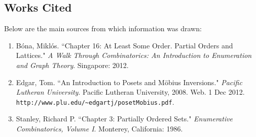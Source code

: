 \documentclass{article} %
\theoremstyle{definition}
\theoremstyle{plain}
\begin{document}


\newpage
\begin{center}
\section*{Works Cited}
\end{center}
Below are the main sources from which information was drawn:
\begin{enumerate}
\item{B\'{o}na, Mikl\'{o}s. ``Chapter 16: At Least Some Order. Partial Orders and Lattices." \textit{A Walk Through Combinatorics: An Introduction to Enumeration and Graph Theory}. Singapore: 2012.}
\item{Edgar, Tom. ``An Introduction to Posets and M\"{o}bius Inversions." \textit{Pacific Lutheran University}. Pacific Lutheran University, 2008. Web. 1 Dec 2012. \verb|http://www.plu.edu/~edgartj/posetMobius.pdf|.}
\item{Stanley, Richard P. ``Chapter 3: Partially Ordered Sets." \textit{Enumerative Combinatorics, Volume I}. Monterey, California: 1986.}
\end{enumerate}
\end{document}
